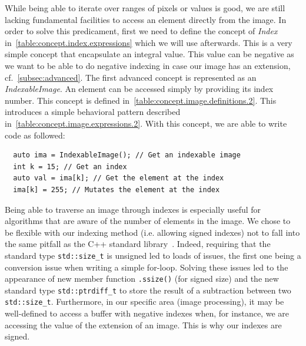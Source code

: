 While being able to iterate over ranges of pixels or values is good, we are still lacking fundamental facilities to
access an element directly from the image. In order to solve this predicament, first we need to define the concept of
\emph{Index} in~\cref{table:concept.index.expressions} which we will use afterwards. This is a very simple concept that
encapsulate an integral value. This value can be negative as we want to be able to do negative indexing in case our
image has an extension, cf.~\cref{subsec:advanced}. The first advanced concept is represented as an
\emph{IndexableImage}. An element can be accessed simply by providing its index number. This concept is defined
in~\cref{table:concept.image.definitions.2}. This introduces a simple behavioral pattern described
in~\cref{table:concept.image.expressions.2}. With this concept, we are able to write code as followed:
\begin{verbatim}
  auto ima = IndexableImage(); // Get an indexable image
  int k = 15; // Get an index
  auto val = ima[k]; // Get the element at the index
  ima[k] = 255; // Mutates the element at the index
\end{verbatim}
Being able to traverse an image through indexes is especially useful for algorithms that are aware of the number of
elements in the image. We chose to be flexible with our indexing method (i.e. allowing signed indexes) not to fall into
the same pitfall as the C++ standard library~\parencite{stroustrup.2019.signed-unsigned-mess}. Indeed, requiring that
the standard type \texttt{std::size\_t} is unsigned led to loads of issues, the first one being a conversion issue when
writing a simple for-loop. Solving these issues led to the appearance of new member function \texttt{.ssize()} (for
signed size) and the new standard type \texttt{std::ptrdiff\_t} to store the result of a subtraction between two
\texttt{std::size\_t}. Furthermore, in our specific area (image processing), it may be well-defined to access a buffer
with negative indexes when, for instance, we are accessing the value of the extension of an image. This is why our
indexes are signed.

